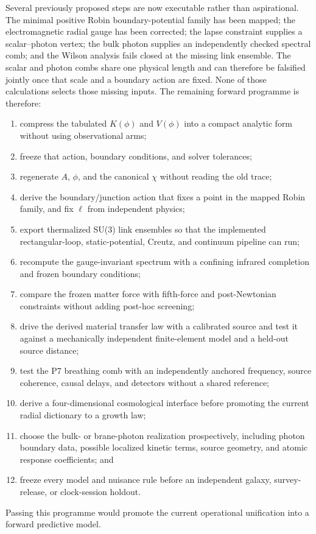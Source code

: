 \documentclass[10pt]{article}
\begin{document}
Several previously proposed steps are now executable rather than aspirational.
The minimal positive Robin boundary-potential family has been mapped; the electromagnetic
radial gauge has been corrected; the lapse constraint supplies a scalar--photon
vertex; the bulk photon supplies an independently checked spectral comb; and
the Wilson analysis fails closed at the missing link ensemble.  The scalar and
photon combs share one physical length and can therefore be falsified jointly
once that scale and a boundary action are fixed.  None of those calculations
selects those missing inputs.  The remaining forward programme is therefore:
\begin{enumerate}
 \item compress the tabulated $K(\phi)$ and $V(\phi)$ into a compact analytic
 form without using observational arms;
 \item freeze that action, boundary conditions, and solver tolerances;
 \item regenerate $A$, $\phi$, and the canonical $\chi$ without reading the old
 trace;
 \item derive the boundary/junction action that fixes a point in the mapped
 Robin family, and fix $\ell$ from independent physics;
 \item export thermalized SU(3) link ensembles so that the implemented
 rectangular-loop, static-potential, Creutz, and continuum pipeline can run;
 \item recompute the gauge-invariant spectrum with a confining infrared
 completion and frozen boundary conditions;
 \item compare the frozen matter force with fifth-force and post-Newtonian
 constraints without adding post-hoc screening;
 \item drive the derived material transfer law with a calibrated source and
 test it against a mechanically independent finite-element model and a held-out
 source distance;
 \item test the P7 breathing comb with an independently anchored frequency,
 source coherence, causal delays, and detectors without a shared reference;
 \item derive a four-dimensional cosmological interface before promoting the
 current radial dictionary to a growth law;
 \item choose the bulk- or brane-photon realization prospectively, including
 photon boundary data, possible localized kinetic terms, source geometry, and
 atomic response coefficients; and
 \item freeze every model and nuisance rule before an independent galaxy,
 survey-release, or clock-session holdout.
\end{enumerate}
Passing this programme would promote the current operational unification into
a forward predictive model.
\end{document}
